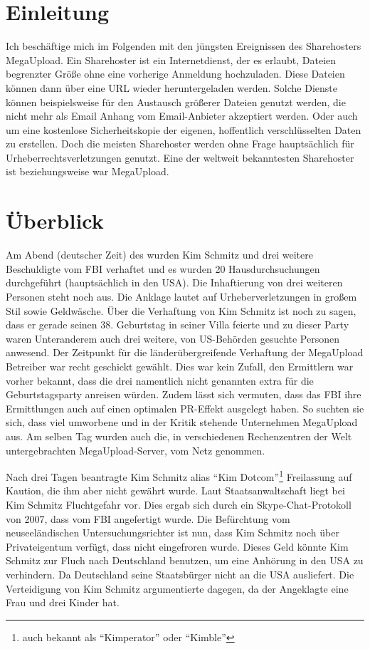 \section{Einleitung}
Ich beschäftige mich im Folgenden mit den jüngsten Ereignissen des Sharehosters MegaUpload. Ein
Sharehoster ist ein Internetdienst, der es erlaubt, Dateien begrenzter Größe ohne eine vorherige
Anmeldung hochzuladen. Diese Dateien können dann über eine URL wieder heruntergeladen werden. Solche
Dienste können beispielsweise für den Austausch größerer Dateien genutzt werden, die nicht mehr als
Email Anhang vom Email-Anbieter akzeptiert werden. Oder auch um eine kostenlose Sicherheitskopie der
eigenen, hoffentlich verschlüsselten Daten zu erstellen.
Doch die meisten Sharehoster werden ohne Frage hauptsächlich für Urheberrechtsverletzungen genutzt.
Eine der weltweit bekanntesten Sharehoster ist beziehungsweise war MegaUpload.

\section{Überblick}
Am Abend (deutscher Zeit) des  wurden Kim Schmitz
und drei weitere Beschuldigte vom FBI verhaftet
und es wurden 20 Hausdurchsuchungen durchgeführt (hauptsächlich in den USA). Die
Inhaftierung von drei weiteren Personen steht noch aus. Die Anklage lautet auf Urheberverletzungen
in großem Stil sowie Geldwäsche. Über die Verhaftung von Kim Schmitz ist noch zu sagen, dass er
gerade seinen 38. Geburtstag in seiner Villa feierte und zu dieser Party waren Unteranderem auch
drei weitere, von US-Behörden gesuchte Personen anwesend. Der Zeitpunkt für die länderübergreifende
Verhaftung der MegaUpload Betreiber war recht geschickt gewählt. Dies war kein Zufall, den
Ermittlern war vorher bekannt, dass die drei namentlich nicht genannten extra für die
Geburtstagsparty anreisen würden. Zudem lässt sich vermuten, dass das FBI ihre Ermittlungen auch auf
einen optimalen PR-Effekt ausgelegt haben. So suchten sie sich, dass viel umworbene und in der
Kritik stehende Unternehmen MegaUpload aus.
Am selben Tag wurden auch die, in verschiedenen Rechenzentren der Welt untergebrachten
MegaUpload-Server, vom Netz genommen.

Nach drei Tagen beantragte Kim Schmitz alias \enquote{Kim Dotcom}\footnote{auch bekannt als
\enquote{Kimperator} oder \enquote{Kimble}} Freilassung auf Kaution, die ihm aber nicht
gewährt wurde.
Laut Staatsanwaltschaft liegt bei Kim Schmitz Fluchtgefahr vor. Dies ergab sich durch ein
Skype-Chat-Protokoll von 2007, dass vom FBI angefertigt wurde. Die Befürchtung vom neuseeländischen
Untersuchungsrichter ist nun, dass Kim Schmitz noch über Privateigentum verfügt, dass nicht
eingefroren wurde. Dieses Geld könnte Kim Schmitz zur Fluch nach Deutschland benutzen, um eine
Anhörung in den USA zu verhindern. Da Deutschland seine Staatsbürger nicht an die USA ausliefert.
Die Verteidigung von Kim Schmitz argumentierte dagegen, da der Angeklagte eine Frau und drei Kinder
hat.

